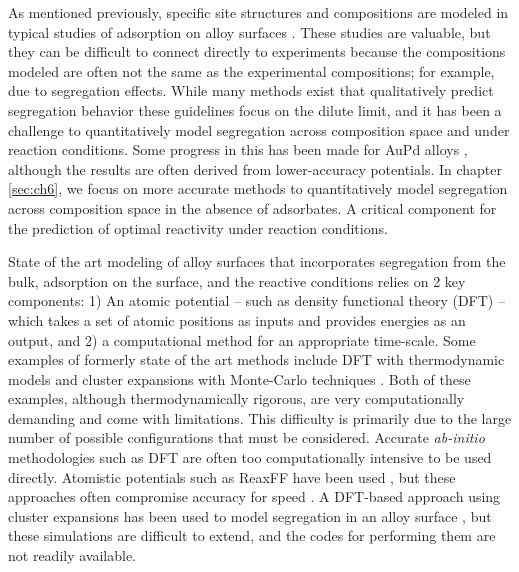 \documentclass[12pt]{cmuthesis}
\begin{document}
As mentioned previously, specific site structures and compositions are modeled in typical studies of adsorption on alloy surfaces \cite{alfonso-2003-densit-funct,greeley-2009-combin-densit}. These studies are valuable, but they can be difficult to connect directly to experiments because the compositions modeled are often not the same as the experimental compositions; for example, due to segregation effects. While many methods exist that qualitatively predict segregation behavior \cite{ruban-1999-calcul,skriver-2000-steps,nilekar-2009-surfac,han-2009-step-decor} these guidelines focus on the dilute limit, and it has been a challenge to quantitatively model segregation across composition space and under reaction conditions. Some progress in this has been made for AuPd alloys \cite{soto-verdugo-2007-segreg-at,atanasov-2009-equil-order,creuze-2015-surfac-segreg}, although the results are often derived from lower-accuracy potentials. In chapter \ref{sec:ch6}, we focus on more accurate methods to quantitatively model segregation across composition space in the absence of adsorbates. A critical component for the prediction of optimal reactivity under reaction conditions.

State of the art modeling of alloy surfaces that incorporates segregation from the bulk, adsorption on the surface, and the reactive conditions relies on 2 key components: 1) An atomic potential -- such as density functional theory (DFT) -- which takes a set of atomic positions as inputs and provides energies as an output, and 2) a computational method for an appropriate time-scale. Some examples of formerly state of the art methods include DFT with thermodynamic models \cite{kitchin-2008-alloy} and cluster expansions with Monte-Carlo techniques \cite{han-2005-surfac-segreg,mei-2009-hydrog-acety}. Both of these examples, although thermodynamically rigorous, are very computationally demanding and come with limitations. This difficulty is primarily due to the large number of possible configurations that must be considered. Accurate \emph{ab-initio} methodologies such as DFT are often too computationally intensive to be used directly. Atomistic potentials such as ReaxFF have been used \cite{kwak-2012-ab-initio}, but these approaches often compromise accuracy for speed \cite{boes-2016-neural-networ}. A DFT-based approach using cluster expansions has been used to model segregation in an alloy surface \cite{han-2005-surfac-segreg,welker-2010-predic-segreg}, but these simulations are difficult to extend, and the codes for performing them are not readily available.
\end{document}
